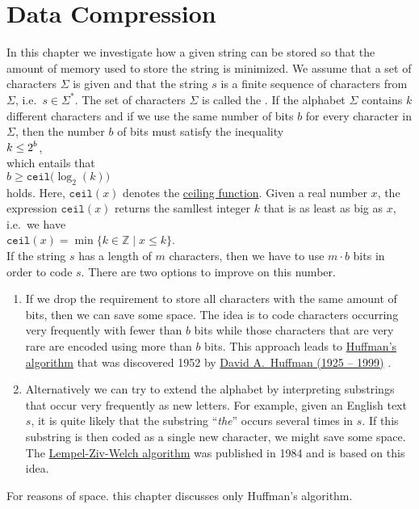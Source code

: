 \chapter{Data Compression}
In this chapter we investigate how a given string can be stored so that the amount of memory used to store the
string is minimized.   We assume that a set of characters $\Sigma$ is given and that the string $s$ is a finite
sequence of characters from $\Sigma$, i.e.~$s \in \Sigma^*$.  The set of characters $\Sigma$ is called the
.  If the alphabet $\Sigma$ contains $k$ different characters and if we use the same number of
bits $b$ for every character in $\Sigma$, then the number $b$ of bits must satisfy the inequality
\\[0.2cm]
\hspace*{1.3cm}
$\displaystyle k \leq 2^b$,
\\[0.2cm]
which entails that 
\\[0.2cm]
\hspace*{1.3cm}
$b \geq \mathtt{ceil}\bigl(\log_2(k)\bigr)$
\\[0.2cm]
holds.  Here, $\mathtt{ceil}(x)$ denotes the
\href{https://en.wikipedia.org/wiki/Floor_and_ceiling_functions}{ceiling function}.  Given a real number $x$,
the expression $\mathtt{ceil}(x)$ returns the samllest integer $k$ that is as least as big as $x$, i.e.~we have
\\[0.2cm]
\hspace*{1.3cm}
$\mathtt{ceil}(x) = \min \{ k \in \mathbb{Z} \mid x \leq k \}$. 
\\[0.2cm]
If the string $s$ has a length of $m$ characters, then we have to use $m \cdot b$ bits in order to code $s$. 
There are two options to improve on this number.
\begin{enumerate}
\item If we drop the requirement to store all characters with the same amount of bits, then we can save some space.
      The idea is to code characters occurring very frequently with fewer than $b$ bits while those characters
      that are very rare are encoded using more than $b$ bits.  This approach leads to 
      \href{https://en.wikipedia.org/wiki/Huffman_coding}{Huffman's algorithm} that was discovered 1952 by 
      \href{https://en.wikipedia.org/wiki/David_A._Huffman}{David A.~Huffman (1925 -- 1999)} \cite{huffman:52}.
\item Alternatively we can try to extend the alphabet by interpreting substrings that occur very frequently as
      new letters.  For example, given an English text $s$, it is quite likely that the substring 
      ``\emph{the}'' occurs several times in $s$.  If this substring is then coded as a single new character,
      we might save some space.  The 
      \href{https://en.wikipedia.org/wiki/Lempel-Ziv-Welch}{Lempel-Ziv-Welch algorithm} 
      \cite{ziv:77,ziv:78,welch:84} was published in 1984 and is based on this idea.

\end{enumerate}
For reasons of space. this chapter discusses only Huffman's algorithm.

